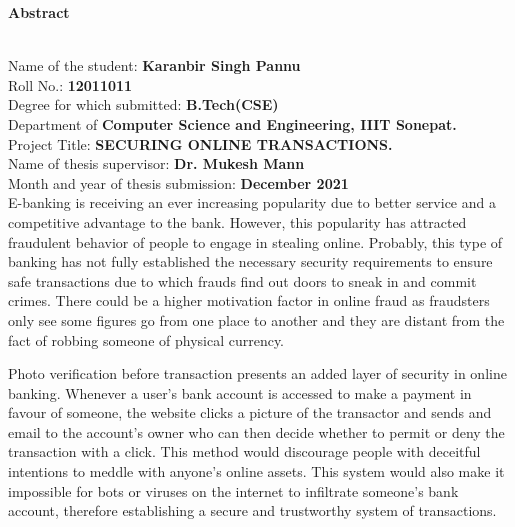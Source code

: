 \documentclass[12pt, oneside, a4paper]{article}
\begin{document}
\begin{center}
    \begin{Large}\textbf{Abstract}\end{Large}
\end{center}\\
\vspace{1cm}
Name of the student: \textbf{Karanbir Singh Pannu}\vspace{0.1cm}\\
Roll No.: \textbf{12011011}
\vspace{0.3cm}\\
Degree for which submitted: \textbf{B.Tech(CSE)}\vspace{0.2cm}\\
Department of \textbf{Computer Science and Engineering, IIIT Sonepat.}\vspace{0.2cm}\\
Project Title: \textbf{SECURING ONLINE TRANSACTIONS.}\vspace{0.2cm}\\
Name of thesis supervisor: \textbf{Dr. Mukesh Mann}\vspace{0.2cm}\\
Month and year of thesis submission: \textbf{December 2021}
\vspace{2cm}\\
E-banking is receiving an ever increasing popularity due to better service and a competitive advantage to the bank. However, this popularity has attracted fraudulent behavior of people to engage in stealing online. Probably, this type of banking has not fully established the necessary security requirements to ensure safe transactions due to which frauds find out doors to sneak in and commit crimes. There could be a higher motivation factor in online fraud as fraudsters only see some figures go from one place to another and they are distant from the fact of robbing someone of physical currency.

\vspace{0.5cm}
Photo verification before transaction presents an added layer of security in online banking. Whenever a user's bank account is accessed to make a payment in favour of someone, the website clicks a picture of the transactor and sends and email to the account's owner who can then decide whether to permit or deny the transaction with a click. This method would discourage people with deceitful intentions to meddle with anyone's online assets. This system would also make it impossible for bots or viruses on the internet to infiltrate someone's bank account, therefore establishing a secure and trustworthy system of transactions.
\end{document}
